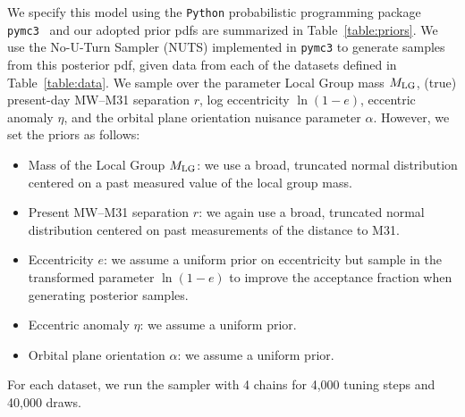 \documentclass[twocolumn]{aastex631}
\newcommand{\mlg}{\ensuremath{M_{\rm LG}}}
\begin{document}
We specify this model using the \texttt{Python} probabilistic programming
package \texttt{pymc3}~\citep{Salvatier2016} and our adopted prior pdfs are
summarized in Table~\ref{table:priors}.
We use the No-U-Turn Sampler (NUTS) \citep{Homan2014} implemented in
\texttt{pymc3} to generate samples from this posterior pdf, given data from each
of the datasets defined in Table~\ref{table:data}.
We sample over the parameter Local Group mass $\mlg$, (true) present-day MW--M31
separation $r$, log eccentricity $\ln\left(1 - e\right)$, eccentric anomaly
$\eta$, and the orbital plane orientation nuisance parameter $\alpha$.
However, we set the priors as follows:
\begin{itemize}
  \item Mass of the Local Group $\mlg$: we use a broad, truncated normal
  distribution centered on a past measured value of the local group mass.
  \item Present MW--M31 separation $r$: we again use a broad, truncated normal
  distribution centered on past measurements of the distance to M31.
  \item Eccentricity $e$: we assume a uniform prior on eccentricity but sample
  in the transformed parameter $\ln(1-e)$ to improve the acceptance fraction
  when generating posterior samples.
  \item Eccentric anomaly $\eta$: we assume a uniform prior.
  \item Orbital plane orientation $\alpha$: we assume a uniform prior.
\end{itemize}

For each dataset, we run the sampler with 4 chains for 4,000 tuning steps and
40,000 draws.

\end{document}
